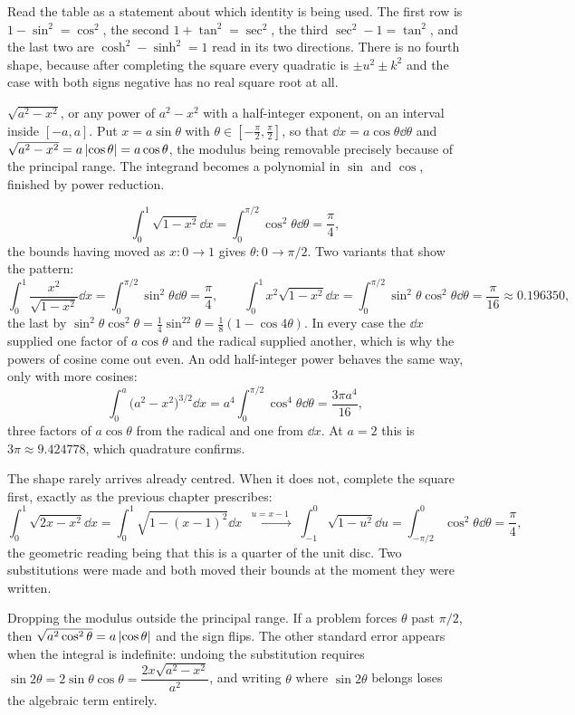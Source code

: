 Read the table as a statement about which identity is being used. The first row is $1-\sin^2=\cos^2$, the second $1+\tan^2=\sec^2$, the third $\sec^2-1=\tan^2$, and the last two are $\cosh^2-\sinh^2=1$ read in its two directions. There is no fourth shape, because after completing the square every quadratic is $\pm u^2\pm k^2$ and the case with both signs negative has no real square root at all.

\cue $\sqrt{a^2-x^2}$, or any power of $a^2-x^2$ with a half-integer exponent, on an interval inside $[-a,a]$.
\method Put $x=a\sin\theta$ with $\theta\in[-\tfrac\pi2,\tfrac\pi2]$, so that $\dd x=a\cos\theta\dd\theta$ and $\sqrt{a^2-x^2}=a\left\lvert \cos\theta\right\rvert=a\cos\theta$, the modulus being removable precisely because of the principal range. The integrand becomes a polynomial in $\sin$ and $\cos$, finished by power reduction.

\begin{worked}
\[
\int_0^1\sqrt{1-x^2}\dd x=\int_0^{\pi/2}\cos^2\theta\dd\theta=\frac{\pi}{4},
\]
the bounds having moved as $x:0\to1$ gives $\theta:0\to\pi/2$. Two variants that show the pattern:
\[
\int_0^1\frac{x^2}{\sqrt{1-x^2}}\dd x=\int_0^{\pi/2}\sin^2\theta\dd\theta=\frac{\pi}{4},
\qquad
\int_0^1x^2\sqrt{1-x^2}\dd x=\int_0^{\pi/2}\sin^2\theta\cos^2\theta\dd\theta=\frac{\pi}{16}\approx0.196350 ,
\]
the last by $\sin^2\theta\cos^2\theta=\tfrac14\sin^22\theta=\tfrac18(1-\cos4\theta)$. In every case the $\dd x$ supplied one factor of $a\cos\theta$ and the radical supplied another, which is why the powers of cosine come out even. An odd half-integer power behaves the same way, only with more cosines:
\[
\int_0^{a}\bigl(a^2-x^2\bigr)^{3/2}\dd x=a^4\int_0^{\pi/2}\cos^4\theta\dd\theta=\frac{3\pi a^4}{16},
\]
three factors of $a\cos\theta$ from the radical and one from $\dd x$. At $a=2$ this is $3\pi\approx9.424778$, which quadrature confirms.

The shape rarely arrives already centred. When it does not, complete the square first, exactly as the previous chapter prescribes:
\[
\int_0^1\sqrt{2x-x^2}\dd x=\int_0^1\sqrt{1-(x-1)^2}\dd x
\;\xrightarrow{\;u=x-1\;}\;\int_{-1}^{0}\sqrt{1-u^2}\dd u=\int_{-\pi/2}^{0}\cos^2\theta\dd\theta=\frac{\pi}{4},
\]
the geometric reading being that this is a quarter of the unit disc. Two substitutions were made and both moved their bounds at the moment they were written.
\end{worked}

\begin{trap}
Dropping the modulus outside the principal range. If a problem forces $\theta$ past $\pi/2$, then $\sqrt{a^2\cos^2\theta}=a\left\lvert \cos\theta\right\rvert$ and the sign flips. The other standard error appears when the integral is indefinite: undoing the substitution requires $\sin2\theta=2\sin\theta\cos\theta=\dfrac{2x\sqrt{a^2-x^2}}{a^2}$, and writing $\theta$ where $\sin2\theta$ belongs loses the algebraic term entirely.
\end{trap}

